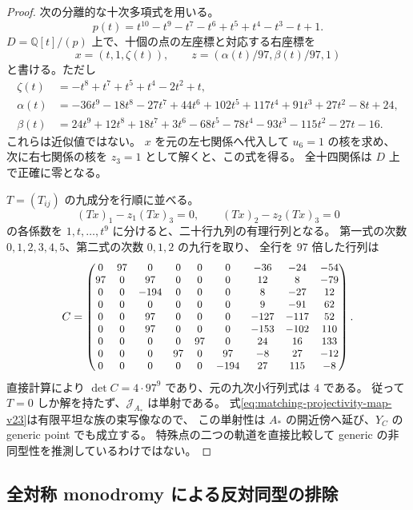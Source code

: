 \begin{proof}
次の分離的な十次多項式を用いる。
\[
 p(t)=t^{10}-t^9-t^7-t^6+t^5+t^4-t^3-t+1.
\]
$D=\mathbb Q[t]/(p)$ 上で、十個の点の左座標と対応する右座標を
\[
 x=(t,1,\zeta(t)),\qquad z=(\alpha(t)/97,\beta(t)/97,1)
\]
と書ける。ただし
\begin{align*}
 \zeta(t)&=-t^8+t^7+t^5+t^4-2t^2+t,\\
 \alpha(t)&=-36t^9-18t^8-27t^7+44t^6+102t^5+117t^4
                  +91t^3+27t^2-8t+24,\\
 \beta(t)&=24t^9+12t^8+18t^7+3t^6-68t^5-78t^4
                  -93t^3-115t^2-27t-16.
\end{align*}
これらは近似値ではない。
$x$ を元の左七関係へ代入して $u_6=1$ の核を求め、
次に右七関係の核を $z_3=1$ として解くと、この式を得る。
全十四関係は $D$ 上で正確に零となる。

$T=(T_{ij})$ の九成分を行順に並べる。
\[
 (Tx)_1-z_1(Tx)_3=0,\qquad
 (Tx)_2-z_2(Tx)_3=0
\]
の各係数を $1,t,\ldots,t^9$ に分けると、二十行九列の有理行列となる。
第一式の次数 $0,1,2,3,4,5$、第二式の次数 $0,1,2$ の九行を取り、
全行を $97$ 倍した行列は
\[
\small
 C=\begin{pmatrix}
0&97&0&0&0&0&-36&-24&-54\\
97&0&97&0&0&0&12&8&-79\\
0&0&-194&0&0&0&8&-27&12\\
0&0&0&0&0&0&9&-91&62\\
0&0&97&0&0&0&-127&-117&52\\
0&0&97&0&0&0&-153&-102&110\\
0&0&0&0&97&0&24&16&133\\
0&0&0&97&0&97&-8&27&-12\\
0&0&0&0&0&-194&27&115&-8
\end{pmatrix}.
\]
直接計算により $\det C=4\cdot97^9$ であり、元の九次小行列式は $4$ である。
従って $T=0$ しか解を持たず、$\mathcal J_{A_*}$ は単射である。
式\eqref{eq:matching-projectivity-map-v23}は有限平坦な族の束写像なので、
この単射性は $A_*$ の開近傍へ延び、$Y_C$ の generic point でも成立する。
特殊点の二つの軌道を直接比較して generic の非同型性を推測しているわけではない。
\end{proof}

\subsection{全対称 monodromy による反対同型の排除}

